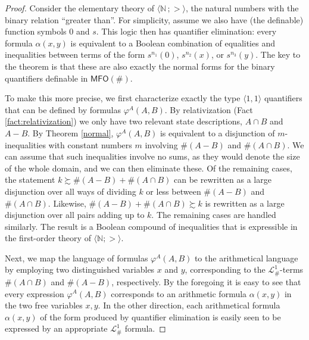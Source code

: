 \documentclass[12pt,oneside,reqno]{amsart}
\newtheorem{corollary}{Corollary}
\theoremstyle{definition}
\begin{document}
\binaryq*
\begin{proof}


Consider the elementary theory of $\langle\mathbb{N}\,;>\rangle$, the natural numbers with the binary relation ``greater than''. For simplicity, assume we also have (the definable) function symbols $0$ and $s$. This logic then has quantifier elimination: every formula $\alpha(x,y)$ is equivalent to a Boolean combination of equalities and inequalities between terms of the form $s^{n_1}(0)$, $s^{n_2}(x)$, or $s^{n_3}(y)$. The key to the theorem is  that these are also exactly the normal forms for the binary quantifiers definable in $\mathsf{MFO}(\#)$.

To make this more precise, we first characterize exactly the type $\langle 1, 1 \rangle$ quantifiers that can be defined by formulas $\varphi^A(A,B)$. By relativization (Fact \ref{fact:relativization}) we only have two relevant state descriptions, $A\cap B$ and $A-B$. By Theorem \ref{normal},  $\varphi^A(A,B)$ is equivalent to a disjunction of $m$-inequalities with constant numbers $m$ involving $\#(A-B)$ and $\#(A\cap B)$. We can assume that such inequalities involve no sums, as they would denote the size of the whole domain, and we can then eliminate these. Of the remaining cases, the statement $k \succsim \#(A-B)+\#(A\cap B)$ can be rewritten as a large disjunction over all ways of dividing $k$ or less between $\#(A-B)$ and $\#(A\cap B)$. Likewise, $\#(A-B ) + \#(A\cap B) \succsim k$ is rewritten as a large disjunction over all pairs adding up to $k$. The remaining cases are handled similarly. The result is a Boolean compound of inequalities that is expressible in the first-order theory of $\langle \mathbb{N}; >\rangle$.

Next, we map the language of formulas $\varphi^A(A,B)$ to the arithmetical language by employing two distinguished variables $x$ and $y$, corresponding to the $\mathcal{L}_\#^1$-terms $\#(A\cap B)$ and $\#(A-B)$, respectively. By the foregoing it is easy to see that every expression $\varphi^A(A,B)$ corresponds to an arithmetic formula $\alpha(x,y)$ in the two free variables $x,y$. In the other direction, each arithmetical formula $\alpha(x,y)$ of the form produced by quantifier elimination is easily seen to  be expressed by an appropriate $\mathcal{L}_\#^1$ formula.
\end{proof}
\end{document}
